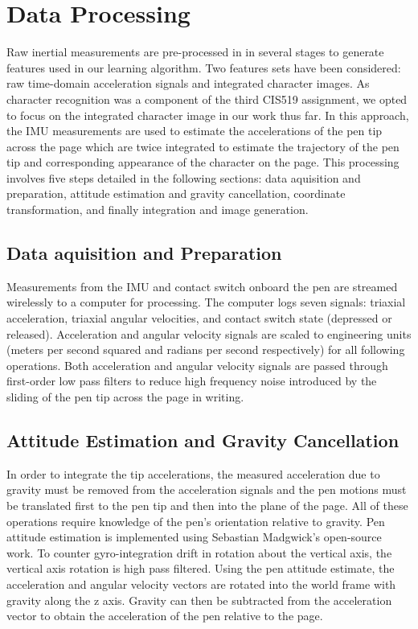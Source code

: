 \documentclass{article}
\begin{document}
\section{Data Processing} 
Raw inertial measurements are pre-processed in in several stages to generate features used in our learning algorithm. Two features sets have been considered: raw time-domain acceleration signals and integrated character images. As character recognition was a component of the third CIS519 assignment, we opted to focus on the integrated character image in our work thus far. In this approach, the IMU measurements are used to estimate the accelerations of the pen tip across the page which are twice integrated to estimate the trajectory of the pen tip and corresponding appearance of the character on the page. This processing involves five steps detailed in the following sections: data aquisition and preparation, attitude estimation and gravity cancellation, coordinate transformation, and finally integration and image generation.

\subsection{Data aquisition and Preparation}
Measurements from the IMU and contact switch onboard the pen are streamed wirelessly to a computer for processing. The computer logs seven signals: triaxial acceleration, triaxial angular velocities, and contact switch state (depressed or released). Acceleration and angular velocity signals are scaled to engineering units (meters per second squared and radians per second respectively) for all following operations. Both acceleration and angular velocity signals are passed through first-order low pass filters to reduce high frequency noise introduced by the sliding of the pen tip across the page in writing.

\subsection{Attitude Estimation and Gravity Cancellation}
In order to integrate the tip accelerations, the measured acceleration due to gravity must be removed from the acceleration signals and the pen motions must be translated first to the pen tip and then into the plane of the page. All of these operations require knowledge of the pen's orientation relative to gravity. Pen attitude estimation is implemented using Sebastian Madgwick's open-source work. To counter gyro-integration drift in rotation about the vertical axis, the vertical axis rotation is high pass filtered. Using the pen attitude estimate, the acceleration and angular velocity vectors are rotated into the world frame with gravity along the z axis. Gravity can then be subtracted from the acceleration vector to obtain the acceleration of the pen relative to the page.
\end{document}
